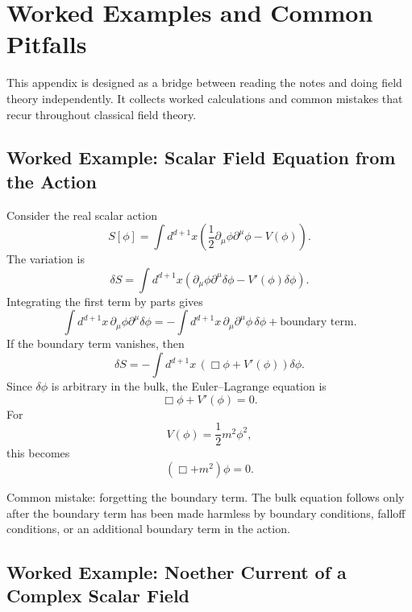 \chapter{Worked Examples and Common Pitfalls}

\begin{remarkbox}
This appendix is designed as a bridge between reading the notes and doing field
theory independently. It collects worked calculations and common mistakes that
recur throughout classical field theory.
\end{remarkbox}

\section{Worked Example: Scalar Field Equation from the Action}

Consider the real scalar action
\[
    S[\phi]=\int d^{d+1}x\left(
        \frac{1}{2}\partial_\mu\phi\partial^\mu\phi - V(\phi)
    \right).
\]
The variation is
\[
    \delta S=\int d^{d+1}x\left(
        \partial_\mu\phi\partial^\mu\delta\phi - V'(\phi)\delta\phi
    \right).
\]
Integrating the first term by parts gives
\[
    \int d^{d+1}x\,\partial_\mu\phi\partial^\mu\delta\phi
    =-\int d^{d+1}x\,\partial_\mu\partial^\mu\phi\,\delta\phi
    +\text{boundary term}.
\]
If the boundary term vanishes, then
\[
    \delta S=-\int d^{d+1}x\,\left(\Box\phi+V'(\phi)\right)\delta\phi.
\]
Since \(\delta\phi\) is arbitrary in the bulk, the Euler--Lagrange equation is
\[
    \Box\phi+V'(\phi)=0.
\]
For
\[
    V(\phi)=\frac{1}{2}m^2\phi^2,
\]
this becomes
\[
    (\Box+m^2)\phi=0.
\]

\begin{remarkbox}
Common mistake: forgetting the boundary term. The bulk equation follows only
after the boundary term has been made harmless by boundary conditions, falloff
conditions, or an additional boundary term in the action.
\end{remarkbox}

\section{Worked Example: Noether Current of a Complex Scalar Field}


